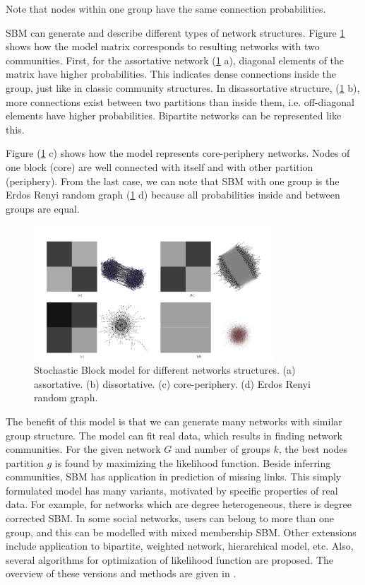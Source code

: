 Note that nodes within one group have the same connection probabilities.

SBM can generate and describe different types of network structures. Figure \ref{fig:SBM} \cite{userguide} shows how the model matrix corresponds to resulting networks with two communities. First, for the assortative network (\ref{fig:SBM} a), diagonal elements of the matrix have higher probabilities. This indicates dense connections inside the group, just like in classic community structures. In disassortative structure, (\ref{fig:SBM} b), more connections exist between two partitions than inside them, i.e. off-diagonal elements have higher probabilities. Bipartite networks can be represented like this. 

Figure (\ref{fig:SBM} c) shows how the model represents core-periphery networks. Nodes of one block (core) are well connected with itself and with other partition (periphery). From the last case, we can note that SBM with one group is the Erdos Renyi random graph (\ref{fig:SBM} d) because all probabilities inside and between groups are equal.

\begin{figure}[!h]
	\centering
	\includegraphics[width=0.8\textwidth]{Figures/structures.png}
	\caption{Stochastic Block model for different networks structures. (a) assortative. (b) dissortative. (c) core-periphery. (d) Erdos Renyi random graph.}
	\label{fig:SBM}
\end{figure}

The benefit of this model is that we can generate many networks with similar group structure. The model can fit real data, which results in finding network communities. For the given network $G$ and number of groups $k$, the best nodes partition $g$ is found by maximizing the likelihood function. Beside inferring communities, SBM has application in prediction of missing links. This simply formulated model has many variants, motivated by specific properties of real data. For example, for networks which are degree heterogeneous, there is degree corrected SBM. In some social networks, users can belong to more than one group, and this can be modelled with mixed membership SBM. Other extensions include application to bipartite, weighted network, hierarchical model, etc. Also, several algorithms for optimization of likelihood function are proposed. The overview of these versions and methods are given in \cite{comparison}. 



